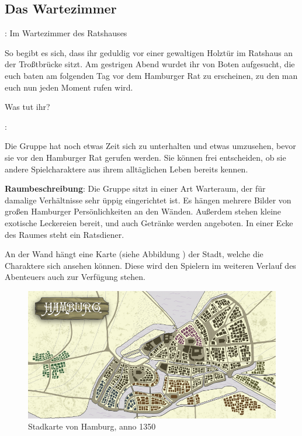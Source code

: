
\subsection{Das Wartezimmer}

: Im Wartezimmer des Ratshauses

So begibt es sich, dass ihr geduldig vor einer gewaltigen Holztür im Ratshaus an der Troßtbrücke sitzt. Am gestrigen Abend wurdet ihr von Boten aufgesucht, die euch baten am folgenden Tag vor dem Hamburger Rat zu erscheinen, zu den man euch nun jeden Moment rufen wird.

Was tut ihr?

:

Die Gruppe hat noch etwas Zeit sich zu unterhalten und etwas umzusehen, bevor sie vor den Hamburger Rat gerufen werden. Sie können frei entscheiden, ob sie andere Spielcharaktere aus ihrem alltäglichen Leben bereits kennen.

\textbf{Raumbeschreibung}: Die Gruppe sitzt in einer Art Warteraum, der für damalige Verhältnisse sehr üppig eingerichtet ist. Es hängen mehrere Bilder von großen Hamburger Persönlichkeiten an den Wänden. Außerdem stehen kleine exotische Leckereien bereit, und auch Getränke werden angeboten. In einer Ecke des Raumes steht ein Ratsdiener.

An der Wand hängt eine Karte (siehe Abbildung \blue{\ref{fig:Karte}}) der Stadt, welche die Charaktere sich ansehen können. Diese wird den Spielern im weiteren Verlauf des Abenteuers auch zur Verfügung stehen.

\begin{figure}[t]
	\begin{center}
		\includegraphics[scale=0.7]{./images/Karte.png}
		\caption{Stadkarte von Hamburg, anno 1350}
    \label{fig:Karte}
	\end{center}
\end{figure}


